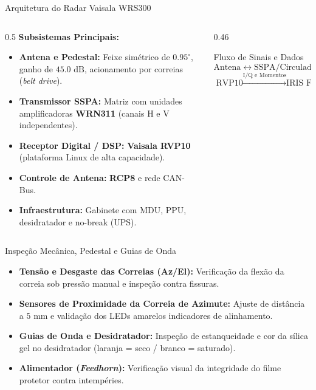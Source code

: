 ﻿\documentclass[aspectratio=169]{beamer}
\begin{document}
\begin{frame}{Arquitetura do Radar Vaisala WRS300}
    \begin{columns}[T]
        \begin{column}{0.5\textwidth}
            \textbf{Subsistemas Principais:}
            \begin{itemize}
                \item \textbf{Antena e Pedestal:} Feixe sim{\'e}trico de $0.95^\circ$, ganho de $45.0\text{ dB}$, acionamento por correias (\textit{belt drive}).
                \item \textbf{Transmissor SSPA:} Matriz com unidades amplificadoras \textbf{WRN311} (canais H e V independentes).
                \item \textbf{Receptor Digital / DSP:} \textbf{Vaisala RVP10} (plataforma Linux de alta capacidade).
                \item \textbf{Controle de Antena:} \textbf{RCP8} e rede CAN-Bus.
                \item \textbf{Infraestrutura:} Gabinete com MDU, PPU, desidratador e no-break (UPS).
            \end{itemize}
        \end{column}
        \begin{column}{0.46\textwidth}
            \begin{block}{Fluxo de Sinais e Dados}
                $$\text{Antena} \leftrightarrow \text{SSPA/Circuladores} \leftrightarrow \text{RVP10 (IF Digital)}$$
                $$\text{RVP10} \xrightarrow{\text{I/Q e Momentos}} \text{IRIS Focus / Analysis}$$
            \end{block}
        \end{column}
    \end{columns}
\end{frame}

\begin{frame}{Inspe{\c{c}}{\~a}o Mec{\^a}nica, Pedestal e Guias de Onda}
    \begin{itemize}
        \item \textbf{Tens{\~a}o e Desgaste das Correias (Az/El):} Verifica{\c{c}}{\~a}o da flex{\~a}o da correia sob press{\~a}o manual e inspe{\c{c}}{\~a}o contra fissuras.
        \item \textbf{Sensores de Proximidade da Correia de Azimute:} Ajuste de dist{\^a}ncia a $5\text{ mm}$ e valida{\c{c}}{\~a}o dos LEDs amarelos indicadores de alinhamento.
        \item \textbf{Guias de Onda e Desidratador:} Inspe{\c{c}}{\~a}o de estanqueidade e cor da s{\'i}lica gel no desidratador (laranja = seco / branco = saturado).
        \item \textbf{Alimentador (\textit{Feedhorn}):} Verifica{\c{c}}{\~a}o visual da integridade do filme protetor contra intemp{\'e}ries.
    \end{itemize}
\end{frame}
\end{document}
